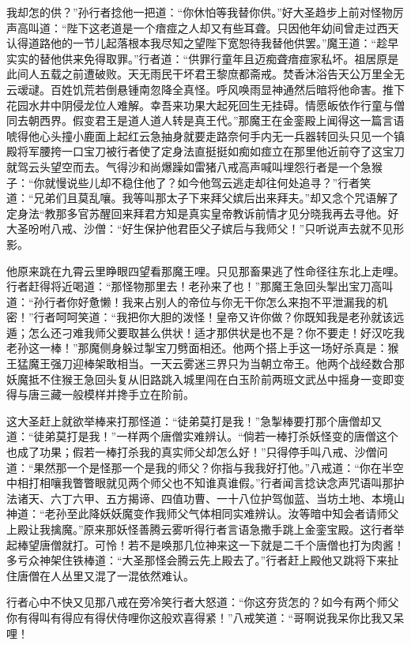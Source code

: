 \documentclass[12pt,UTF8]{ctexbook}
\begin{document}
我却怎的供？”孙行者捻他一把道：“你休怕等我替你供。”好大圣趋步上前对怪物厉声高叫道：“陛下这老道是一个瘖痖之人却又有些耳聋。只因他年幼间曾走过西天认得道路他的一节儿起落根本我尽知之望陛下宽恕待我替他供罢。”魔王道：“趁早实实的替他供来免得取罪。”行者道：“供罪行童年且迈痴聋瘖痖家私坏。祖居原是此间人五载之前遭破败。天无雨民干坏君王黎庶都斋戒。焚香沐浴告天公万里全无云叆叇。百姓饥荒若倒悬锺南忽降全真怪。呼风唤雨显神通然后暗将他命害。推下花园水井中阴侵龙位人难解。幸吾来功果大起死回生无挂碍。情愿皈依作行童与僧同去朝西界。假变君王是道人道人转是真王代。”那魔王在金銮殿上闻得这一篇言语唬得他心头撞小鹿面上起红云急抽身就要走路奈何手内无一兵器转回头只见一个镇殿将军腰挎一口宝刀被行者使了定身法直挺挺如痴如痖立在那里他近前夺了这宝刀就驾云头望空而去。气得沙和尚爆躁如雷猪八戒高声喊叫埋怨行者是一个急猴子：“你就慢说些儿却不稳住他了？如今他驾云逃走却往何处追寻？”行者笑道：“兄弟们且莫乱嚷。我等叫那太子下来拜父嫔后出来拜夫。”却又念个咒语解了定身法“教那多官苏醒回来拜君方知是真实皇帝教诉前情才见分晓我再去寻他。好大圣吩咐八戒、沙僧：“好生保护他君臣父子嫔后与我师父！”只听说声去就不见形影。

他原来跳在九霄云里睁眼四望看那魔王哩。只见那畜果逃了性命径往东北上走哩。行者赶得将近喝道：“那怪物那里去！老孙来了也！”那魔王急回头掣出宝刀高叫道：“孙行者你好惫懒！我来占别人的帝位与你无干你怎么来抱不平泄漏我的机密！”行者呵呵笑道：“我把你大胆的泼怪！皇帝又许你做？你既知我是老孙就该远遁；怎么还刁难我师父要取甚么供状！适才那供状是也不是？你不要走！好汉吃我老孙这一棒！”那魔侧身躲过掣宝刀劈面相还。他两个搭上手这一场好杀真是：猴王猛魔王强刀迎棒架敢相当。一天云雾迷三界只为当朝立帝王。他两个战经数合那妖魔抵不住猴王急回头复从旧路跳入城里闯在白玉阶前两班文武丛中摇身一变即变得与唐三藏一般模样并搀手立在阶前。

这大圣赶上就欲举棒来打那怪道：“徒弟莫打是我！”急掣棒要打那个唐僧却又道：“徒弟莫打是我！”一样两个唐僧实难辨认。“倘若一棒打杀妖怪变的唐僧这个也成了功果；假若一棒打杀我的真实师父却怎么好！”只得停手叫八戒、沙僧问道：“果然那一个是怪那一个是我的师父？你指与我我好打他。”八戒道：“你在半空中相打相嚷我瞥瞥眼就见两个师父也不知谁真谁假。”行者闻言捻诀念声咒语叫那护法诸天、六丁六甲、五方揭谛、四值功曹、一十八位护驾伽蓝、当坊土地、本境山神道：“老孙至此降妖妖魔变作我师父气体相同实难辨认。汝等暗中知会者请师父上殿让我擒魔。”原来那妖怪善腾云雾听得行者言语急撒手跳上金銮宝殿。这行者举起棒望唐僧就打。可怜！若不是唤那几位神来这一下就是二千个唐僧也打为肉酱！多亏众神架住铁棒道：“大圣那怪会腾云先上殿去了。”行者赶上殿他又跳将下来扯住唐僧在人丛里又混了一混依然难认。

行者心中不快又见那八戒在旁冷笑行者大怒道：“你这夯货怎的？如今有两个师父你有得叫有得应有得伏侍哩你这般欢喜得紧！”八戒笑道：“哥啊说我呆你比我又呆哩！
\end{document}
